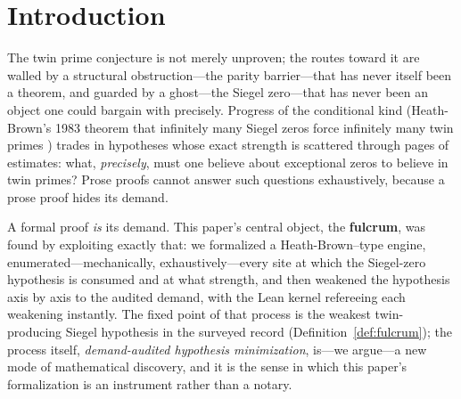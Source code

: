 \documentclass{CUP-JNL-FMP}
\theoremstyle{remark}
\begin{document}
\maketitle

\section{Introduction}\label{sec:intro}

The twin prime conjecture is not merely unproven; the routes toward it are
walled by a structural obstruction---the parity barrier---that has never
itself been a theorem, and guarded by a ghost---the Siegel zero---that has
never been an object one could bargain with precisely. Progress of the
conditional kind (Heath-Brown's 1983 theorem that infinitely many Siegel
zeros force infinitely many twin primes \cite{HB1983}) trades in
hypotheses whose exact strength is scattered through pages of estimates:
what, \emph{precisely}, must one believe about exceptional zeros to
believe in twin primes? Prose proofs cannot answer such questions
exhaustively, because a prose proof hides its demand.

A formal proof \emph{is} its demand. This paper's central object, the
\textbf{fulcrum}, was found by exploiting exactly that: we formalized a
Heath-Brown--type engine, enumerated---mechanically, exhaustively---every
site at which the Siegel-zero hypothesis is consumed and at what strength,
and then weakened the hypothesis axis by axis to the audited demand, with
the Lean kernel refereeing each weakening instantly. The fixed point of
that process is the weakest twin-producing Siegel hypothesis in the
surveyed record (Definition~\ref{def:fulcrum}); the process itself,
\emph{demand-audited hypothesis minimization}, is---we
argue---a new mode of mathematical discovery, and it is the sense in which this paper's
formalization is an instrument rather than a notary.
\end{document}
